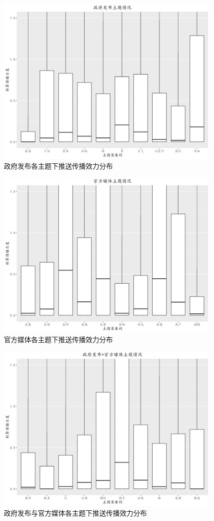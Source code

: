 \documentclass[a4paper,12pt,UTF8]{article}
\begin{document}
    \begin{figure}
      \centering
      \includegraphics[width=0.9\linewidth]{政府发布.png}
      \caption{政府发布各主题下推送传播效力分布}
      \label{fig:zffb-box}
    \end{figure}
    \begin{figure}
      \centering
      \includegraphics[width=0.9\linewidth]{官方媒体.png}
      \caption{官方媒体各主题下推送传播效力分布}
      \label{fig:gfmt-box}
    \end{figure}
    \begin{figure}
      \centering
      \includegraphics[width=0.9\linewidth]{政府发布+官方媒体.png}
      \caption{政府发布与官方媒体各主题下推送传播效力分布}
      \label{fig:zffbgfmt-box}
    \end{figure}
    \appendix
\end{document}
